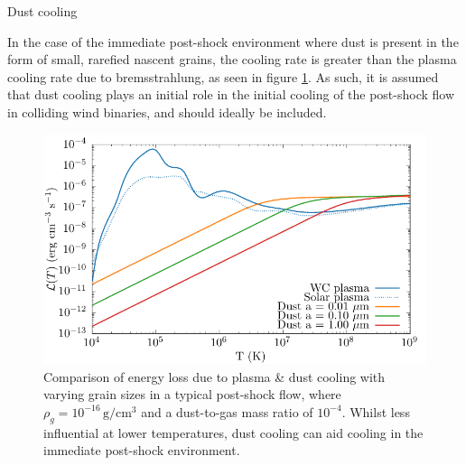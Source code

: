 Dust cooling 


In the case of the immediate post-shock environment where dust is present in the form of small, rarefied nascent grains, the cooling rate is greater than the plasma cooling rate due to bremsstrahlung, as seen in figure \ref{fig:postshockcoolcomparison-chapter3}.
As such, it is assumed that dust cooling plays an initial role in the initial cooling of the post-shock flow in colliding wind binaries, and should ideally be included.

\begin{figure}
  \centering
  \includegraphics{assets/dust-plasma-cooling-comparison/cooling-comparison-forpaper2.pdf}
  \caption[Comparison of dust and plasma cooling rates in post-shock environment]{Comparison of energy loss due to plasma \& dust cooling with varying grain sizes in a typical post-shock flow, where $\rho_g = 10^{-16} \, \si{\gram\per\centi\metre\cubed}$ and a dust-to-gas mass ratio of $10^{-4}$. Whilst less influential at lower temperatures, dust cooling can aid cooling in the immediate post-shock environment.}
  \label{fig:postshockcoolcomparison-chapter3}
\end{figure}


